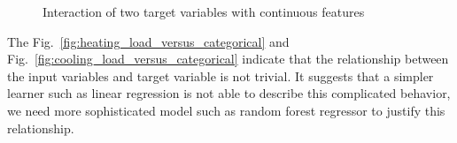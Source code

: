 \documentclass{article}
\begin{document}
\begin{figure}[!bht]
\centering     \captionsetup{font=footnotesize, width=.6\textwidth}
{}
\caption{Interaction of two target variables with continuous features} 
\end{figure}

The Fig.~\ref{fig:heating_load_versus_categorical} and Fig.~\ref{fig:cooling_load_versus_categorical} indicate that the relationship between the input variables and target variable is not trivial. It suggests that a simpler learner such as linear regression is not able to describe this complicated behavior, we need more sophisticated model such as random forest regressor to justify this relationship.
\end{document}
